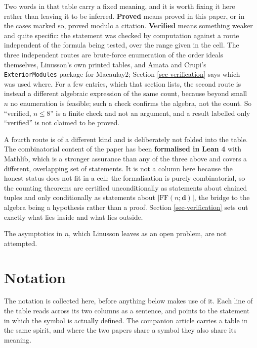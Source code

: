 \documentclass[11pt, a4paper, abstract=yes]{scrartcl}
\theoremstyle{definition}
\theoremstyle{remark}
\theoremstyle{plain}
\newcommand{\vek}[1]{\boldsymbol{#1}}
\begin{document}
Two words in that table carry a fixed meaning, and it is worth fixing it here rather than leaving it
to be inferred. \textbf{Proved} means proved in this paper, or in the cases marked so, proved modulo a
citation. \textbf{Verified} means something weaker and quite specific: the statement was checked by
computation against a route independent of the formula being tested, over the range given in the
cell. The three independent routes are brute-force enumeration of the order ideals themselves,
Linusson's own printed tables, and Amata and Crupi's \texttt{ExteriorModules} package for Macaulay2; Section
\ref{sec-verification} says which was used where. For a few entries, which that section lists, the
second route is instead a different algebraic expression of the same count, because beyond small
\(n\) no enumeration is feasible; such a check confirms the algebra, not the count. So ``verified, \(n\le8\)'' is a finite check and not
an argument, and a result labelled only ``verified'' is not claimed to be proved.

A fourth route is of a different kind and is deliberately not folded into the table. The
combinatorial content of the paper has been \textbf{formalised in Lean 4} with Mathlib, which is a stronger
assurance than any of the three above and covers a different, overlapping set of statements. It is
not a column here because the honest status does not fit in a cell: the formalisation is purely
combinatorial, so the counting theorems are certified unconditionally as statements about chained
tuples and only conditionally as statements about \(\lvert\mathrm{FF}(n;\vek d)\rvert\), the bridge to
the algebra being a hypothesis rather than a proof. Section \ref{sec-verification} sets out exactly
what lies inside and what lies outside.

The asymptotics in \(n\), which Linusson leaves as an open problem, are not attempted.
\section{Notation}
\label{sec-notation}
The notation is collected here, before anything below makes use of it. Each line of the table reads
across its two columns as a sentence, and points to the statement in which the symbol is actually
defined. The companion article carries a table in the same spirit, and where the two papers share a
symbol they also share its meaning.
\end{document}

